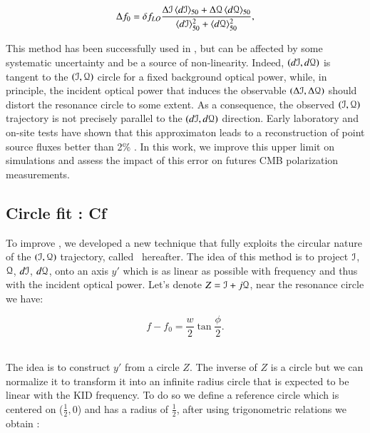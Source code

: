 \begin{equation}
\label{eq:Rf}
\Delta f_{0} = \delta f_{LO} \frac{\Delta \mathcal{I}\, \langle d\mathcal{I}
  \rangle_{50}
+ \Delta \mathcal{Q}\, \langle d\mathcal{Q} \rangle_{50}}{\langle d\mathcal{I}
  \rangle_{50}^{2}
 + \langle d\mathcal{Q} \rangle_{50}^{2}},
\end{equation}



This method has been successfully used in , but can be affected by
some systematic uncertainty and be a source of non-linearity. Indeed,
$(d\mathcal{I},d\mathcal{Q})$ is tangent to the $(\mathcal{I},\mathcal{Q})$ circle for a fixed background optical
power, while, in principle, the incident optical power that induces the
observable $(\Delta \mathcal{I}, \Delta \mathcal{Q})$ should distort the resonance circle to some
extent. As a consequence, the observed $(\mathcal{I},\mathcal{Q})$ trajectory is not precisely
parallel to the $(d\mathcal{I},d\mathcal{Q})$ direction. Early laboratory and on-site tests have
shown that this approximaton leads to a reconstruction of point source fluxes
better than 2\% \citep{2013A&A...551L..12C}. In this work, we improve this upper
limit on simulations and assess the impact of this error on futures CMB
polarization measurements.

\subsection{Circle fit : Cf}
To improve \rf, we developed a new technique that fully exploits the circular
nature of the $(\mathcal{I},\mathcal{Q})$ trajectory, called \cf\ hereafter. The idea of this
method is to project $\mathcal{I}$, $\mathcal{Q}$, $d\mathcal{I}$, $d\mathcal{Q}$, onto an axis $y'$ which is
as linear as possible with frequency and thus with the incident optical
power. Let's denote $Z = \mathcal{I} + j\mathcal{Q}$, near the resonance circle we have:

\begin{equation}
f - f_{0}= \frac{w}{2} \tan \frac{\phi}{2}.
\label{eq:hyp-f}
\end{equation}

\\
The idea is to construct $y'$ from a circle $Z$. The inverse of $Z$ is a circle
but we can normalize it to transform it into an infinite radius circle that is
expected to be linear with the KID frequency.  To do so we define a reference
circle which is centered on ($\frac{1}{2},0$) and has a radius of $\frac{1}{2}$,
after using trigonometric relations we obtain :

